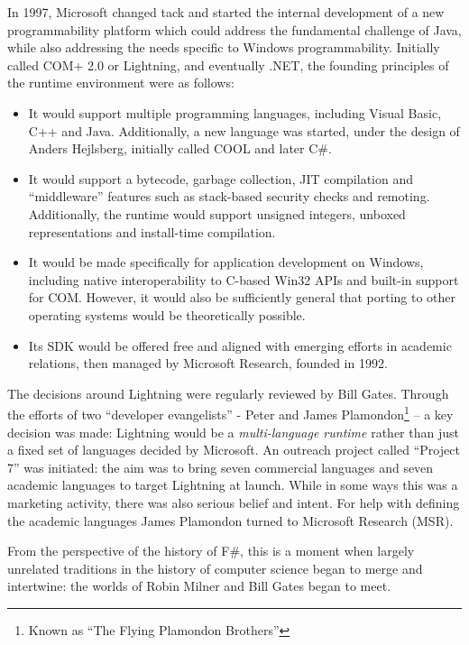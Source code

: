 \documentclass[acmsmall,review]{acmart}\settopmatter{printfolios=true,printccs=false,printacmref=false}
\begin{document}
In 1997, Microsoft changed tack and started the internal development of a new programmability platform which could address the fundamental challenge of Java, while also addressing the needs specific to Windows programmability.  Initially called COM+ 2.0 or Lightning, and eventually .NET, the founding principles of the runtime environment were as follows:
\begin{itemize}
\item It would support multiple programming languages, including Visual Basic, C++ and Java. Additionally, a new language was started, under the design of Anders Hejlsberg, initially called COOL and later C\#.
\item It would support a bytecode, garbage collection, JIT compilation and “middleware” features such as stack-based security checks and remoting. Additionally, the runtime would support unsigned integers, unboxed representations and install-time compilation.
\item It would be made specifically for application development on Windows, including native interoperability to C-based Win32 APIs and built-in support for COM. However, it would also be sufficiently general that porting to other operating systems would be theoretically possible.
\item Its SDK would be offered free and aligned with emerging efforts in academic relations, then managed by Microsoft Research, founded in 1992.
\end{itemize}

The decisions around Lightning were regularly reviewed by Bill Gates. Through the efforts of two “developer evangelists” - Peter and James Plamondon\footnote{ Known as “The Flying Plamondon Brothers”}  – a key decision was made: Lightning would be a \emph{multi-language runtime} rather than just a fixed set of languages decided by Microsoft.  An outreach project called “Project 7” was initiated: the aim was to bring seven commercial languages and seven academic languages to target Lightning at launch. While in some ways this was a marketing activity, there was also serious belief and intent.  For help with defining the academic languages James Plamondon turned to Microsoft Research (MSR).

From the perspective of the history of F\#, this is a moment when largely unrelated traditions in the history of computer science began to merge and intertwine: the worlds of Robin Milner and Bill Gates began to meet.
\end{document}

